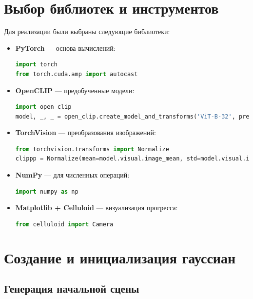 \section{Выбор библиотек и инструментов}

Для реализации были выбраны следующие библиотеки:

\begin{itemize}
    \item \textbf{PyTorch} --- основа вычислений:
    \begin{lstlisting}[language=Python]
import torch
from torch.cuda.amp import autocast
    \end{lstlisting}

    \item \textbf{OpenCLIP} --- предобученные модели:
    \begin{lstlisting}[language=Python]
import open_clip
model, _, _ = open_clip.create_model_and_transforms('ViT-B-32', pretrained='laion2b_s34b_b79k')
    \end{lstlisting}

    \item \textbf{TorchVision} --- преобразования изображений:
    \begin{lstlisting}[language=Python]
from torchvision.transforms import Normalize
clippp = Normalize(mean=model.visual.image_mean, std=model.visual.image_std)
    \end{lstlisting}

    \item \textbf{NumPy} --- для численных операций:
    \begin{lstlisting}[language=Python]
import numpy as np
    \end{lstlisting}

    \item \textbf{Matplotlib + Celluloid} --- визуализация прогресса:
    \begin{lstlisting}[language=Python]
from celluloid import Camera
    \end{lstlisting}
\end{itemize}

\section{Создание и инициализация гауссиан}

\subsection{Генерация начальной сцены}

